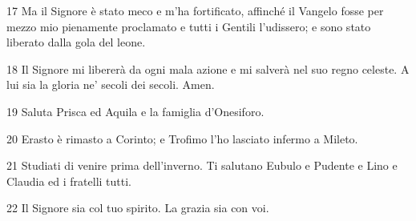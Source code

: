 \par 17 Ma il Signore è stato meco e m'ha fortificato, affinché il Vangelo fosse per mezzo mio pienamente proclamato e tutti i Gentili l'udissero; e sono stato liberato dalla gola del leone.
\par 18 Il Signore mi libererà da ogni mala azione e mi salverà nel suo regno celeste. A lui sia la gloria ne' secoli dei secoli. Amen.
\par 19 Saluta Prisca ed Aquila e la famiglia d'Onesiforo.
\par 20 Erasto è rimasto a Corinto; e Trofimo l'ho lasciato infermo a Mileto.
\par 21 Studiati di venire prima dell'inverno. Ti salutano Eubulo e Pudente e Lino e Claudia ed i fratelli tutti.
\par 22 Il Signore sia col tuo spirito. La grazia sia con voi.


